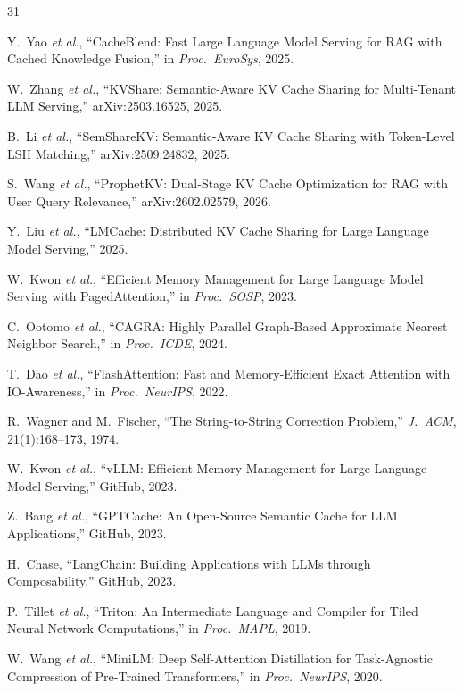 \documentclass[10pt,twocolumn]{article}
\begin{document}
\begin{thebibliography}{31}

Y.~Yao \textit{et al.},
``CacheBlend: Fast Large Language Model Serving for RAG with Cached
Knowledge Fusion,''
in \textit{Proc.\ EuroSys}, 2025.

W.~Zhang \textit{et al.},
``KVShare: Semantic-Aware KV Cache Sharing for Multi-Tenant LLM
Serving,''
arXiv:2503.16525, 2025.

B.~Li \textit{et al.},
``SemShareKV: Semantic-Aware KV Cache Sharing with Token-Level LSH
Matching,''
arXiv:2509.24832, 2025.

S.~Wang \textit{et al.},
``ProphetKV: Dual-Stage KV Cache Optimization for RAG with User Query
Relevance,''
arXiv:2602.02579, 2026.

Y.~Liu \textit{et al.},
``LMCache: Distributed KV Cache Sharing for Large Language Model
Serving,''
2025.

W.~Kwon \textit{et al.},
``Efficient Memory Management for Large Language Model Serving with
PagedAttention,''
in \textit{Proc.\ SOSP}, 2023.

C.~Ootomo \textit{et al.},
``CAGRA: Highly Parallel Graph-Based Approximate Nearest Neighbor
Search,''
in \textit{Proc.\ ICDE}, 2024.

T.~Dao \textit{et al.},
``FlashAttention: Fast and Memory-Efficient Exact Attention with
IO-Awareness,''
in \textit{Proc.\ NeurIPS}, 2022.

R.~Wagner and M.~Fischer,
``The String-to-String Correction Problem,''
\textit{J.\ ACM}, 21(1):168--173, 1974.

W.~Kwon \textit{et al.},
``vLLM: Efficient Memory Management for Large Language Model Serving,''
GitHub, 2023.

Z.~Bang \textit{et al.},
``GPTCache: An Open-Source Semantic Cache for LLM Applications,''
GitHub, 2023.

H.~Chase,
``LangChain: Building Applications with LLMs through Composability,''
GitHub, 2023.

P.~Tillet \textit{et al.},
``Triton: An Intermediate Language and Compiler for Tiled Neural
Network Computations,''
in \textit{Proc.\ MAPL}, 2019.

W.~Wang \textit{et al.},
``MiniLM: Deep Self-Attention Distillation for Task-Agnostic
Compression of Pre-Trained Transformers,''
in \textit{Proc.\ NeurIPS}, 2020.


\end{thebibliography}
\end{document}
